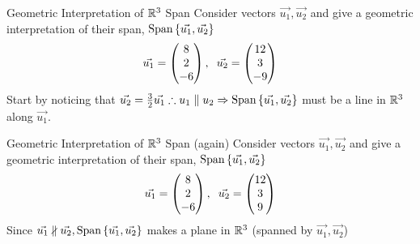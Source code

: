 \begin{example}{Geometric Interpretation of $\mathbb R^{3}$ Span}{}
    Consider vectors $\vec{u_1}, \vec{u_2}$ and give a geometric interpretation of their span, $\text{Span}\left\{\vec{u_1}, \vec{u_2} \right\}$
    \[
        \vec{u_1} = \begin{pmatrix} 8 \\ 2 \\ -6 \end{pmatrix}, 
        \hspace{0.2cm} 
        \vec{u_2} = \begin{pmatrix} 12 \\ 3 \\ -9 \end{pmatrix}
    \]
    Start by noticing that $\vec{u_2} = \frac{3}{2}\vec{u_1} \therefore u_1 \parallel u_2 \Rightarrow \text{Span}\left\{\vec{u_1}, \vec{u_2} \right\}$ must be a line in $\mathbb R^{3}$ along $\vec{u_1}$.
\end{example}

\begin{example}{Geometric Interpretation of $\mathbb R^{3}$ Span (again)}
    Consider vectors $\vec{u_1}, \vec{u_2}$ and give a geometric interpretation of their span, $\text{Span}\left\{\vec{u_1}, \vec{u_2} \right\}$
    \[
        \vec{u_1} = \begin{pmatrix} 8 \\ 2 \\ -6 \end{pmatrix}, 
        \hspace{0.2cm} 
        \vec{u_2} = \begin{pmatrix} 12 \\ 3 \\ 9 \end{pmatrix}
    \]
    Since $\vec{u_1} \nparallel \vec{u_2}, \text{Span}\left\{\vec{u_1}, \vec{u_2} \right\}$ makes a plane in $\mathbb R^{3}$ (spanned by $\vec{u_1}, \vec{u_2}$)
\end{example}

